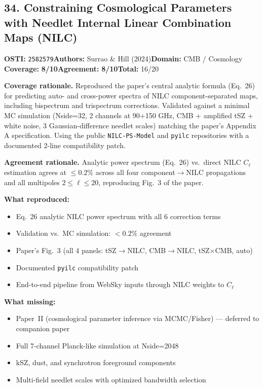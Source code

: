 \documentclass[11pt]{article}
\newcommand{\scorebadge}[2]{\textbf{#1:} \textbf{#2/10}}
\begin{document}
\subsection{34. Constraining Cosmological Parameters with Needlet Internal Linear Combination Maps (NILC)}
\textbf{OSTI:} \texttt{2582579}\quad\textbf{Authors:} Surrao \& Hill (2024)\quad\textbf{Domain:} CMB / Cosmology\\
\scorebadge{Coverage}{8}\quad\scorebadge{Agreement}{8}\quad\textbf{Total:} 16/20\par\smallskip
\noindent\textbf{Coverage rationale.} Reproduced the paper's central analytic formula (Eq.~26) for predicting auto- and cross-power spectra of NILC component-separated maps, including bispectrum and trispectrum corrections. Validated against a minimal MC simulation (Nside=32, 2 channels at 90+150 GHz, CMB + amplified tSZ + white noise, 3 Gaussian-difference needlet scales) matching the paper's Appendix A specification. Using the public \texttt{NILC-PS-Model} and \texttt{pyilc} repositories with a documented 2-line compatibility patch.\par
\noindent\textbf{Agreement rationale.} Analytic power spectrum (Eq.~26) vs.\ direct NILC $C_\ell$ estimation agrees at $\leq 0.2\%$ across all four component$\rightarrow$NILC propagations and all multipoles $2\leq\ell\leq 20$, reproducing Fig.~3 of the paper.\par\smallskip
\noindent\textbf{What reproduced:}
\begin{itemize}[leftmargin=1.4em,itemsep=0.2em,topsep=0.2em]
\item Eq.~26 analytic NILC power spectrum with all 6 correction terms
\item Validation vs.\ MC simulation: $<0.2\%$ agreement
\item Paper's Fig.~3 (all 4 panels: tSZ$\rightarrow$NILC, CMB$\rightarrow$NILC, tSZ$\times$CMB, auto)
\item Documented \texttt{pyilc} compatibility patch
\item End-to-end pipeline from WebSky inputs through NILC weights to $C_\ell$
\end{itemize}
\noindent\textbf{What missing:}
\begin{itemize}[leftmargin=1.4em,itemsep=0.2em,topsep=0.2em]
\item Paper~II (cosmological parameter inference via MCMC/Fisher) --- deferred to companion paper
\item Full 7-channel Planck-like simulation at Nside=2048
\item kSZ, dust, and synchrotron foreground components
\item Multi-field needlet scales with optimized bandwidth selection
\end{itemize}
\end{document}
